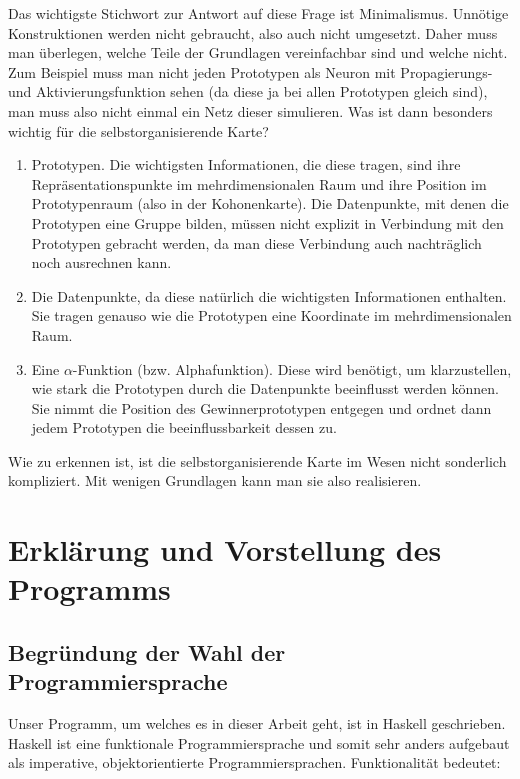 \documentclass[twoside,a4paper,draft]{article}
\begin{document}
\begin{multicols}{2}
Das wichtigste Stichwort zur Antwort auf diese Frage ist Minimalismus. Unnötige Konstruktionen werden nicht gebraucht, also auch nicht umgesetzt. Daher muss man überlegen, welche Teile der Grundlagen vereinfachbar sind und welche nicht. Zum Beispiel muss man nicht jeden Prototypen als Neuron mit Propagierungs- und Aktivierungsfunktion sehen (da diese ja bei allen Prototypen gleich sind), man muss also nicht einmal ein Netz dieser simulieren. Was ist dann besonders wichtig für die selbstorganisierende Karte?

\begin{enumerate}
\item Prototypen. Die wichtigsten Informationen, die diese tragen, sind ihre Repräsentationspunkte im mehrdimensionalen Raum und ihre Position im Prototypenraum (also in der Kohonenkarte). Die Datenpunkte, mit denen die Prototypen eine Gruppe bilden, müssen nicht explizit in Verbindung mit den Prototypen gebracht werden, da man diese Verbindung auch nachträglich noch ausrechnen kann.
\item Die Datenpunkte, da diese natürlich die wichtigsten Informationen enthalten. Sie tragen genauso wie die Prototypen eine Koordinate im mehrdimensionalen Raum.
\item Eine \(\alpha\)-Funktion (bzw. Alphafunktion). Diese wird benötigt, um klarzustellen, wie stark die Prototypen durch die Datenpunkte beeinflusst werden können. Sie nimmt die Position des Gewinnerprototypen entgegen und ordnet dann jedem Prototypen die beeinflussbarkeit dessen zu.
\end{enumerate}

Wie zu erkennen ist, ist die selbstorganisierende Karte im Wesen nicht sonderlich kompliziert. Mit wenigen Grundlagen kann man sie also realisieren.

\section{Erklärung und Vorstellung des Programms}

\subsection{Begründung der Wahl der Programmiersprache}

Unser Programm, um welches es in dieser Arbeit geht, ist in Haskell geschrieben. Haskell ist eine funktionale Programmiersprache und somit sehr anders aufgebaut als imperative, objektorientierte Programmiersprachen. Funktionalität bedeutet:


\end{multicols}
\end{document}
